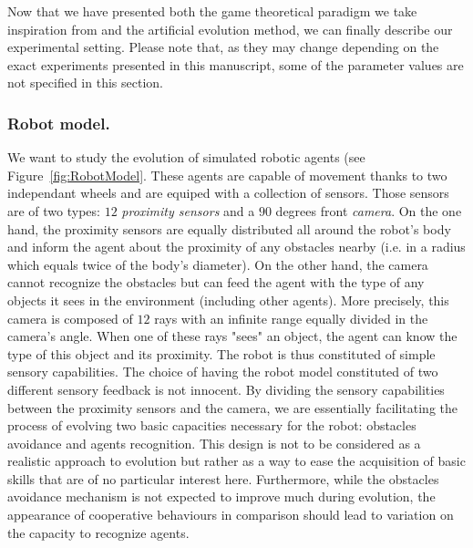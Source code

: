     Now that we have presented both the game theoretical paradigm we take inspiration from and the artificial evolution method, we can finally describe our experimental setting. Please note that, as they may change depending on the exact experiments presented in this manuscript, some of the parameter values are not specified in this section.

    \subsubsection{Robot model.} We want to study the evolution of simulated robotic agents (see Figure~\ref{fig:RobotModel}. These agents are capable of movement thanks to two independant wheels and are equiped with a collection of sensors. Those sensors are of two types: $12$ \emph{proximity sensors} and a $90$ degrees front \emph{camera}. On the one hand, the proximity sensors are equally distributed all around the robot's body and inform the agent about the proximity of any obstacles nearby (i.e. in a radius which equals twice of the body's diameter). On the other hand, the camera cannot recognize the obstacles but can feed the agent with the type of any objects it sees in the environment (including other agents). More precisely, this camera is composed of $12$ rays with an infinite range equally divided in the camera's angle. When one of these rays "sees" an object, the agent can know the type of this object and its proximity. The robot is thus constituted of simple sensory capabilities. The choice of having the robot model constituted of two different sensory feedback is not innocent. By dividing the sensory capabilities between the proximity sensors and the camera, we are essentially facilitating the process of evolving two basic capacities necessary for the robot: obstacles avoidance and agents recognition. This design is not to be considered as a realistic approach to evolution but rather as a way to ease the acquisition of basic skills that are of no particular interest here. Furthermore, while the obstacles avoidance mechanism is not expected to improve much during evolution, the appearance of cooperative behaviours in comparison should lead to variation on the capacity to recognize agents.


